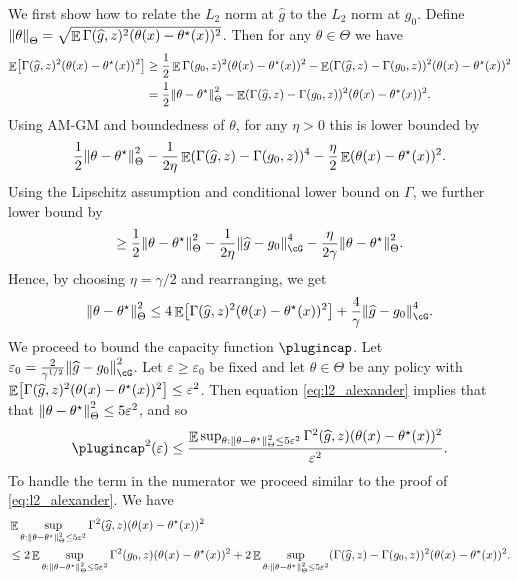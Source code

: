 \documentclass[11pt]{article} %
\newcommand{\pref}[1]{\cref{#1}}
\theoremstyle{theorem}  %
\theoremstyle{plain}
\DeclarePairedDelimiter{\brk}{[}{]}
\DeclarePairedDelimiter{\nrm}{\|}{\|}
\DeclareMathOperator{\En}{\mathbb{E}}
\newcommand{\veps}{\varepsilon}
\newcommand{\wh}[1]{\widehat{#1}}
\newcommand{\estone}{\wh{g}}
\newcommand{\nuisance}{\cG}
\newcommand{\target}{\Theta}
\newcommand{\besttwo}{\theta^{\star}}
\newcommand{\gtone}{g_0}
\begin{document}
We first show how to relate the $L_2$ norm at $\estone$ to the $L_2$ norm at $\gtone$. 
Define $\nrm*{\theta}_{\target}=\sqrt{\En\Gamma(\estone,z)^{2}(\theta(x)-\besttwo(x))^{2}}$.  Then for any $\theta\in\target$ we have
\begin{align*}
\En\brk*{\Gamma(\estone,z)^{2}(\theta(x)-\besttwo(x))^{2}}
&\geq{} \frac{1}{2}\En\Gamma(\gtone,z)^{2}(\theta(x)-\besttwo(x))^{2} - \En(\Gamma(\estone,z)-\Gamma(\gtone,z))^{2}(\theta(x)-\besttwo(x))^{2}\\
  &= \frac{1}{2}\nrm*{\theta-\besttwo}_{\target}^{2} - \En(\Gamma(\estone,z)-\Gamma(\gtone,z))^{2}(\theta(x)-\besttwo(x))^{2}.
    \end{align*}
    Using AM-GM and boundedness of $\theta$, for any $\eta>0$ this is lower bounded by
    \begin{align*}
       \frac{1}{2}\nrm*{\theta-\besttwo}_{\target}^{2} - \frac{1}{2\eta}\En(\Gamma(\estone,z)-\Gamma(\gtone,z))^{4} - \frac{\eta}{2}\En(\theta(x)-\besttwo(x))^{2}.
        \end{align*}
        Using the Lipschitz assumption and conditional lower bound on $\Gamma$, we further lower bound by
        \begin{align*}
\geq \frac{1}{2}\nrm*{\theta-\besttwo}_{\target}^{2} - \frac{1}{2\eta}\nrm*{\estone-\gtone}_{\nuisance}^{4} - \frac{\eta}{2\gamma}\nrm*{\theta-\besttwo}_{\target}^{2}.
\end{align*}
Hence, by choosing $\eta=\gamma/2$ and rearranging, we get
\begin{equation}
\label{eq:l2_alexander}
\nrm*{\theta-\besttwo}_{\target}^{2} \leq{} 4\En\brk*{\Gamma(\estone,z)^{2}(\theta(x)-\besttwo(x))^{2}} + \frac{4}{\gamma}\nrm*{\estone-\gtone}_{\nuisance}^{4}.
\end{equation}
We proceed to bound the capacity function $\plugincap$. Let $\veps_0=\frac{2}{\gamma^{1/2}}\nrm*{\estone-\gtone}_{\nuisance}^{2}$. Let $\veps\geq{}\veps_0$ be fixed and let $\theta\in\target$ be any policy with $\En\brk*{\Gamma(\estone,z)^{2}(\theta(x)-\besttwo(x))^{2}}\leq{}\veps^{2}$. Then equation \pref{eq:l2_alexander} implies that that $\nrm*{\theta-\besttwo}_{\target}^{2}\leq{}5\veps^{2}$, and so
\[
\plugincap^{2}(\veps) \leq{} \frac{\En\sup_{\theta:\nrm*{\theta-\besttwo}_{\target}^{2}\leq{}5\veps^{2}}\Gamma^{2}(\estone,z)(\theta(x)-\besttwo(x))^{2}}{\veps^{2}}.
\]
To handle the term in the numerator we proceed similar to the proof of \pref{eq:l2_alexander}. We have
\begin{align*}
&\En\sup_{\theta:\nrm*{\theta-\besttwo}_{\target}^{2}\leq{}5\veps^{2}}\Gamma^{2}(\estone,z)(\theta(x)-\besttwo(x))^{2}\\
&\leq{} 2\En\sup_{\theta:\nrm*{\theta-\besttwo}_{\target}^{2}\leq{}5\veps^{2}}\Gamma^{2}(\gtone,z)(\theta(x)-\besttwo(x))^{2}
+ 2\En\sup_{\theta:\nrm*{\theta-\besttwo}_{\target}^{2}\leq{}5\veps^{2}}(\Gamma(\estone,z)-\Gamma(\gtone,z))^{2}(\theta(x)-\besttwo(x))^{2}.
\end{align*}
\end{document}
